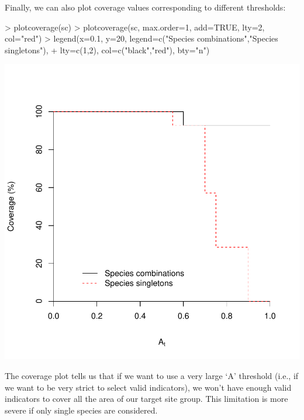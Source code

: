 \documentclass[11pt,a4paper]{article}
\begin{document}
Finally, we can also plot coverage values corresponding to different thresholds:
\begin{center}
\begin{Schunk}
\begin{Sinput}
> plotcoverage(sc)
> plotcoverage(sc, max.order=1, add=TRUE, lty=2, col="red")
> legend(x=0.1, y=20, legend=c("Species combinations","Species singletons"), 
+        lty=c(1,2), col=c("black","red"), bty="n")
\end{Sinput}
\end{Schunk}
\includegraphics{indicspeciesTutorial-033}
\end{center}
The coverage plot tells us that if we want to use a very large `A' threshold (i.e., if we want to be very strict to select valid indicators), we won't have enough valid indicators to cover all the area of our target site group. This limitation is more severe if only single species are considered.
\end{document}
